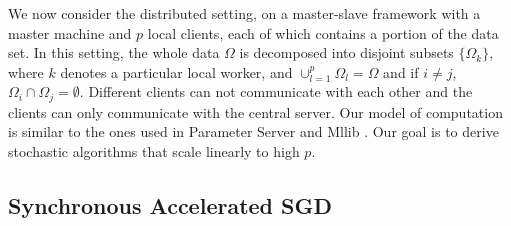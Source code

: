 \documentclass[letterpaper]{article} %
\begin{document}
We now consider the distributed setting, on a master-slave framework with a master machine and $p$ local clients, each of which contains a portion of
the data set. In this setting, the whole data $\Omega$ is decomposed into disjoint
subsets $\{\Omega_k\}$,  where $k$ denotes  a  particular  local  worker,
and $\cup_{l=1}^p{\Omega_l} = \Omega$ and if $i\neq j$, $\Omega_i\cap\Omega_j = \emptyset$. Different clients can not communicate with each other and the  clients  can
only communicate with the central server. Our model of
computation is similar to the ones used in Parameter
Server \cite{Li2014} and Mllib \cite{Meng2016Spark}. Our goal is to
derive stochastic algorithms that scale linearly to high $p$.

\subsection{Synchronous Accelerated SGD}
\end{document}
